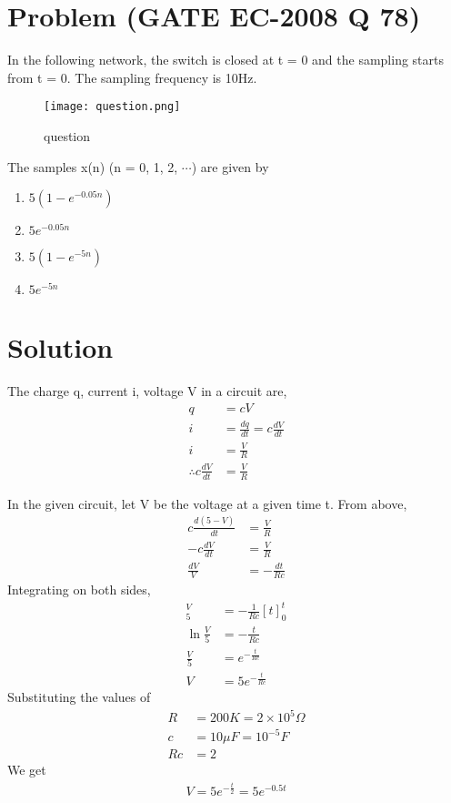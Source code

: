 \documentclass[journal,12pt,twocolumn]{IEEEtran}
\begin{document}
\section*{\textbf{Problem (GATE EC-2008 Q 78)}}
In the following network, the switch is closed at t = 0 and the sampling starts from t = 0. The sampling frequency is 10Hz.

\begin{figure}[!ht]
    \centering
    \texttt{[image: question.png]}
    \caption{question}
    \label{question}
\end{figure}
The samples x(n) (n = 0, 1, 2, $\cdots$) are given by
\begin{enumerate}
   \item $5(1 - e^{-0.05n})$
   \item $5e^{-0.05n}$
   \item $5(1 - e^{-5n})$
   \item $5e^{-5n}$
\end{enumerate}
\section*{\textbf{Solution}}
The charge q, current i, voltage V in a circuit are,
\begin{align}
    q &= cV \\
    i &= \frac{dq}{dt} = c\frac{dV}{dt} \\
    i &= \frac{V}{R} \\
    \therefore c\frac{dV}{dt} &= \frac{V}{R} 
\end{align}

In the given circuit, let V be the voltage at a given time t. From above,
\begin{align}
    c\frac{d(5-V)}{dt} &= \frac{V}{R} \\
    -c\frac{dV}{dt} &= \frac{V}{R} \\
    \frac{dV}{V} &= -\frac{dt}{Rc}
\end{align}
Integrating on both sides,
\begin{align}
    [\ln V]_5^{V} &= -\frac{1}{Rc}[t]_0^{t} \\
    \ln \frac{V}{5} &= -\frac{t}{Rc} \\
    \frac{V}{5} &= e^{-\frac{t}{Rc}} \\
    V &= 5e^{-\frac{t}{Rc}}
\end{align}
Substituting the values of
\begin{align}
    R &= 200 K = 2 \times 10^5 \Omega \\
    c &= 10 \mu F = 10^{-5} F \\
    Rc &= 2
\end{align}
We get
\begin{align}
    V = 5e^{-\frac{t}{2}} = 5e^{-0.5t} \label{eq}
\end{align}
\end{document}

